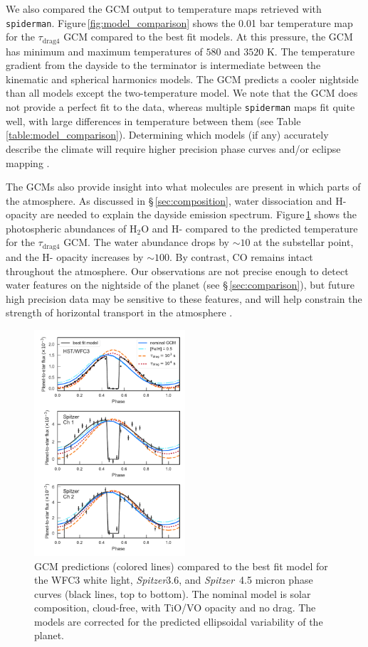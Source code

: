\documentclass[twocolumn]{aastex61}
\newcommand{\project}[1]{\textsl{#1}}
\newcommand{\Spitzer}{\project{Spitzer}}
\begin{document}
We also compared the GCM output to temperature maps retrieved with \texttt{spiderman}. Figure\,\ref{fig:model_comparison} shows the 0.01 bar temperature map for the $\tau_\mathrm{drag4}$ GCM compared to the best fit models. At this pressure, the GCM has minimum and maximum temperatures of $580$ and $3520$ K. The temperature gradient from the dayside to the terminator is intermediate between the kinematic and spherical harmonics models. The GCM predicts a cooler nightside than all models except the two-temperature model. We note that the GCM does not provide a perfect fit to the data, whereas multiple \texttt{spiderman} maps fit quite well, with large differences in temperature between them (see Table \,\ref{table:model_comparison}). Determining which models (if any) accurately describe the climate will require higher precision phase curves and/or eclipse mapping \citep[e.g.][]{dewit12}. 

The GCMs also provide insight into what molecules are present in which parts of the atmosphere. As discussed in \S\,\ref{sec:composition}, water dissociation and H- opacity are needed to explain the dayside emission spectrum. Figure\,\ref{fig:gcmcomparison} shows the photospheric abundances of H$_2$O and H- compared to the predicted temperature for the $\tau_\mathrm{drag4}$ GCM. The water abundance drops by $\sim10$ at the substellar point, and the H- opacity increases by $\sim100$.  By contrast, CO remains intact throughout the atmosphere.  Our observations are not precise enough to detect water features on the nightside of the planet (see \S\,\ref{sec:comparison}), but future high precision data may be sensitive to these features, and will help constrain the strength of horizontal transport in the atmosphere \citep{agundez14}.

\begin{figure}
\includegraphics[width = 0.5\textwidth]{Figures/gcm_comparison.pdf}
\caption{GCM predictions (colored lines) compared to the best fit model for the WFC3 white light, \Spitzer 3.6, and \Spitzer\ 4.5 micron phase curves (black lines, top to bottom). The nominal model is solar composition, cloud-free, with TiO/VO opacity and no drag. The models are corrected for the predicted ellipsoidal variability of the planet.}
\label{fig:gcmcomparison}
\end{figure}
\end{document}
